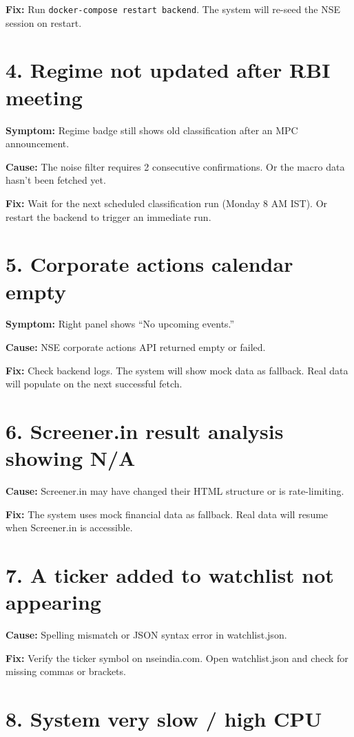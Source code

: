 \documentclass[12pt, a4paper]{report}
\begin{document}
\textbf{Fix:} Run \texttt{docker-compose restart backend}. The system will re-seed the NSE session on restart.

\section{4. Regime not updated after RBI meeting}

\textbf{Symptom:} Regime badge still shows old classification after an MPC announcement.

\textbf{Cause:} The noise filter requires 2 consecutive confirmations. Or the macro data hasn't been fetched yet.

\textbf{Fix:} Wait for the next scheduled classification run (Monday 8 AM IST). Or restart the backend to trigger an immediate run.

\section{5. Corporate actions calendar empty}

\textbf{Symptom:} Right panel shows ``No upcoming events.''

\textbf{Cause:} NSE corporate actions API returned empty or failed.

\textbf{Fix:} Check backend logs. The system will show mock data as fallback. Real data will populate on the next successful fetch.

\section{6. Screener.in result analysis showing N/A}

\textbf{Cause:} Screener.in may have changed their HTML structure or is rate-limiting.

\textbf{Fix:} The system uses mock financial data as fallback. Real data will resume when Screener.in is accessible.

\section{7. A ticker added to watchlist not appearing}

\textbf{Cause:} Spelling mismatch or JSON syntax error in watchlist.json.

\textbf{Fix:} Verify the ticker symbol on nseindia.com. Open watchlist.json and check for missing commas or brackets.

\section{8. System very slow / high CPU}
\end{document}
